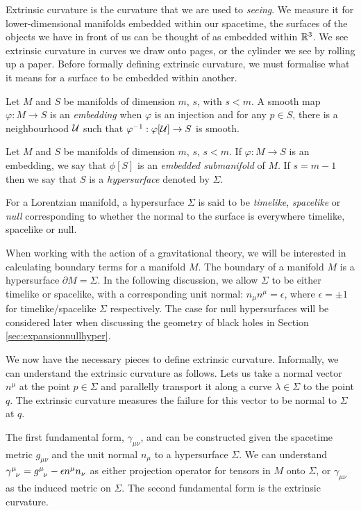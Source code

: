 Extrinsic curvature is the curvature that we are used to \emph{seeing}. We measure it for lower-dimensional manifolds embedded within our spacetime, \eg the surfaces of the objects we have in front of us can be thought of as embedded within ${\mathbb{R}}^3$. We see extrinsic curvature in curves we draw onto pages, or the cylinder we see by rolling up a paper. Before formally defining extrinsic curvature, we must formalise what it means for a surface to be embedded within another.

\begin{defn}
	Let $M$ and $S$ be manifolds of dimension $m$, $s$, with $s < m$. A smooth map $\varphi: M \rightarrow S$ is an \emph{embedding} when $\varphi$ is an injection
		and for any $p \in S$, there is a neighbourhood ${\cal U}$ such that $\varphi^{-1}: \varphi[{\cal U}] \rightarrow S$ is smooth.
\end{defn}
\begin{defn}
	Let $M$ and $S$ be manifolds of dimension $m$, $s$, $s <m$. If $\varphi: M \rightarrow S$ is an embedding, we say that $\phi[S]$ is an \emph{embedded submanifold} of $M$. If $s = m-1$ then we say that $S$ is a \emph{hypersurface} denoted by $\Sigma$.
\end{defn}
For a Lorentzian manifold, a hypersurface $\Sigma$ is said to be \emph{timelike}, \emph{spacelike} or \emph{null} corresponding to whether the normal to the surface is everywhere timelike, spacelike or null. 

When working with the action of a gravitational theory, we will be interested in calculating boundary terms for a manifold $M$. The boundary of a manifold $M$ is a hypersurface $\partial M = \Sigma$. In the following discussion, we allow $\Sigma$ to be either timelike or spacelike, with a corresponding unit normal: $n_\mu n^\mu = \epsilon$, where $\epsilon = \pm 1$ for timelike/spacelike $\Sigma$ respectively. The case for null hypersurfaces will be considered later when discussing the geometry of black holes in Section \ref{sec:expansionnullhyper}.

We now have the necessary pieces to define extrinsic curvature. Informally, we can understand the extrinsic curvature as follows. Lets us take a normal vector $n^\mu$ at the point $p \in \Sigma$ and parallelly transport it along a curve $\lambda \in \Sigma$ to the point $q$. The extrinsic curvature measures the failure for this vector to be normal to $\Sigma$ at $q$. 

The first fundamental form, $\gamma_{\mu \nu}$, and can be constructed given the spacetime metric $g_{\mu \nu}$ and the unit normal $n_\mu$ to a hypersurface $\Sigma$. We can understand $\tensor{\gamma}{^\mu_\nu} = \tensor{g}{^\mu_\nu} - \epsilon n^\mu n_\nu$ as either projection operator for tensors in $M$ onto $\Sigma$, or $\gamma_{\mu \nu}$ as the induced metric on $\Sigma$. The second fundamental form is the extrinsic curvature.

